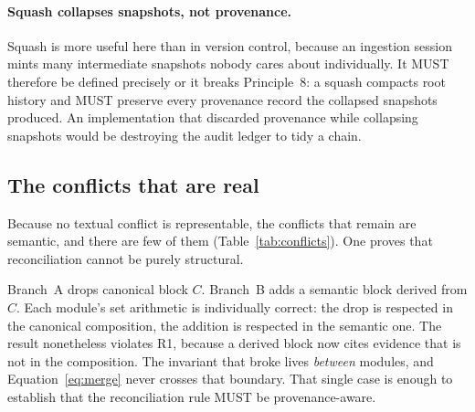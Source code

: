 \documentclass[11pt,a4paper]{article}
\begin{document}
\paragraph{Squash collapses snapshots, not provenance.}
Squash is more useful here than in version control, because an ingestion session
mints many intermediate snapshots nobody cares about individually. It MUST
therefore be defined precisely or it breaks Principle~8: a squash compacts root
history and MUST preserve every provenance record the collapsed snapshots
produced. An implementation that discarded provenance while collapsing snapshots
would be destroying the audit ledger to tidy a chain.

\subsection{The conflicts that are real}
\label{sec:semantic-conflicts}

Because no textual conflict is representable, the conflicts that remain are
semantic, and there are few of them (Table~\ref{tab:conflicts}). One proves
that reconciliation cannot be purely structural.

Branch~A drops canonical block $C$. Branch~B adds a semantic block derived from
$C$. Each module's set arithmetic is individually correct: the drop is respected
in the canonical composition, the addition is respected in the semantic one. The
result nonetheless violates R1, because a derived block now cites evidence that
is not in the composition. The invariant that broke lives \emph{between} modules,
and Equation~\ref{eq:merge} never crosses that boundary. That single case is
enough to establish that the reconciliation rule MUST be provenance-aware.
\end{document}
